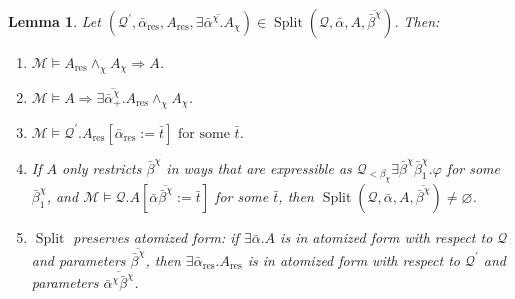 \documentclass{article}
\newcommand{\assign}{:=}
\newcommand{\tmop}[1]{\ensuremath{\operatorname{#1}}}
\newtheorem{lemma}{Lemma}
\begin{document}
\begin{lemma}
  \label{SplitProps}Let $(\mathcal{Q}^{\prime}, \bar{\alpha}_{\tmop{res}},
  A_{\tmop{res}}, \overline{\exists \bar{\alpha}^{\chi} .A_{\chi}}) \in
  \tmop{Split} (\mathcal{Q}, \bar{\alpha}, A, \overline{\bar{\beta}^{\chi}})$.
  Then:
  \begin{enumerate}
    \item $\mathcal{M} \vDash A_{\tmop{res}} \wedge_{\chi} A_{\chi}
    \Rightarrow A$.
    
    \item $\mathcal{M} \vDash A \Rightarrow \exists
    \overline{\bar{\alpha}^{\chi}_+} .A_{\tmop{res}} \wedge_{\chi} A_{\chi}$.
    
    \item $\mathcal{M} \vDash \mathcal{Q}^{\prime} .A_{\tmop{res}}
    [\bar{\alpha}_{\tmop{res}} \assign \bar{t}] \text{ \ for some } \bar{t}$.
    
    \item If $A$ only restricts $\bar{\beta}^{\chi}$ in ways that are
    expressible as $\mathcal{Q}_{< \beta_{\chi}} \exists \bar{\beta}^{\chi}
    \bar{\beta}^{\chi}_1 . \varphi$ for some $\bar{\beta}^{\chi}_1$, and
    $\mathcal{M} \vDash \mathcal{Q}.A [\bar{\alpha}
    \overline{\bar{\beta}^{\chi}} \assign \bar{t}]$ for some $\bar{t}$, then
    $\tmop{Split} (\mathcal{Q}, \bar{\alpha}, A,
    \overline{\bar{\beta}^{\chi}}) \neq \varnothing$.
    
    \item $\tmop{Split}$ preserves atomized form: if $\exists \bar{\alpha} .A$
    is in atomized form with respect to $\mathcal{Q}$ and parameters
    $\overline{\bar{\beta}^{\chi}}$, then $\exists \bar{\alpha}_{\tmop{res}}
    .A_{\tmop{res}}$ is in atomized form with respect to
    $\mathcal{Q}^{\prime}$ and parameters $\overline{\bar{\alpha}^{\chi}
    \bar{\beta}^{\chi}}$.
  \end{enumerate}
\end{lemma}
\end{document}
